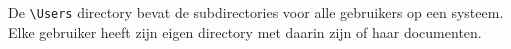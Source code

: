 De \texttt{\textbackslash Users} directory bevat de subdirectories voor alle gebruikers op een systeem. Elke gebruiker heeft zijn eigen directory met daarin zijn of haar documenten.

